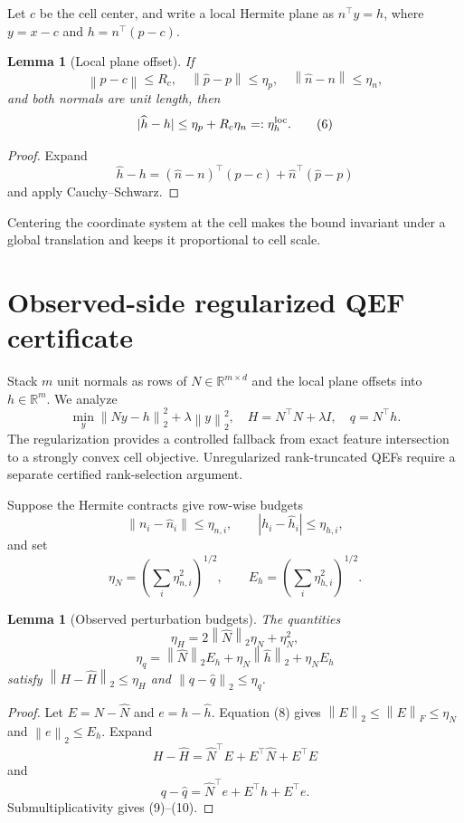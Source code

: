 \documentclass[11pt]{article}
\newtheorem{lemma}[theorem]{Lemma}
\theoremstyle{definition}
\newcommand{\R}{\mathbb{R}}
\newcommand{\norm}[1]{\left\lVert#1\right\rVert}
\begin{document}
Let \(c\) be the cell center, and write a local Hermite plane as
\(
n^\top y=h
\), where \(y=x-c\) and \(h=n^\top(p-c)\).

\begin{lemma}[Local plane offset]
\label{lem:plane}
If
\[
\norm{p-c}\le R_c,
\quad\norm{\widehat p-p}\le\eta_p,
\quad\norm{\widehat n-n}\le\eta_n,
\]
and both normals are unit length, then
\[
|\widehat h-h|\le\eta_p+R_c\eta_n=: \eta_h^{\rm loc}. \tag{6}
\]
\end{lemma}

\begin{proof}
Expand
\[
\widehat h-h
=(\widehat n-n)^\top(p-c)
+\widehat n^\top(\widehat p-p)
\]
and apply Cauchy--Schwarz.
\end{proof}

Centering the coordinate system at the cell makes the bound invariant under a
global translation and keeps it proportional to cell scale.

\section{Observed-side regularized QEF certificate}

Stack \(m\) unit normals as rows of \(N\in\R^{m\times d}\) and the local plane
offsets into \(h\in\R^m\).  We analyze
\[
\min_y\norm{Ny-h}_2^2+\lambda\norm y_2^2,
\quad
H=N^\top N+\lambda I,
\quad q=N^\top h. \tag{7}
\]
The regularization provides a controlled fallback from exact feature
intersection to a strongly convex cell objective.  Unregularized rank-truncated
QEFs require a separate certified rank-selection argument.

Suppose the Hermite contracts give row-wise budgets
\[
\norm{n_i-\widehat n_i}\le\eta_{n,i},
\qquad
|h_i-\widehat h_i|\le\eta_{h,i},
\]
and set
\[
\eta_N=\left(\sum_i\eta_{n,i}^2\right)^{1/2},
\qquad
E_h=\left(\sum_i\eta_{h,i}^2\right)^{1/2}. \tag{8}
\]

\begin{lemma}[Observed perturbation budgets]
\label{lem:qef-budgets}
The quantities
\[
\eta_H=2\norm{\widehat N}_2\eta_N+\eta_N^2, \tag{9}
\]
\[
\eta_q=\norm{\widehat N}_2E_h
+\eta_N\norm{\widehat h}_2+\eta_NE_h \tag{10}
\]
satisfy
\(
\norm{H-\widehat H}_2\le\eta_H
\) and
\(
\norm{q-\widehat q}_2\le\eta_q
\).
\end{lemma}

\begin{proof}
Let \(E=N-\widehat N\) and \(e=h-\widehat h\).  Equation (8) gives
\(
\norm E_2\le\norm E_F\le\eta_N
\) and \(\norm e_2\le E_h\).  Expand
\[
H-\widehat H
=\widehat N^\top E+E^\top\widehat N+E^\top E
\]
and
\[
q-\widehat q
=\widehat N^\top e+E^\top\widehat h+E^\top e.
\]
Submultiplicativity gives (9)--(10).
\end{proof}
\end{document}
